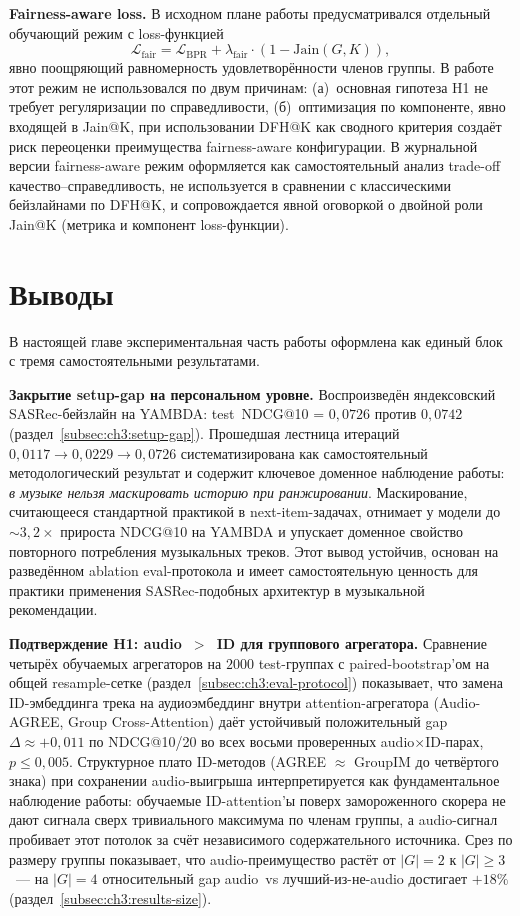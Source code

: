\textbf{Fairness-aware loss.} В исходном плане работы предусматривался отдельный обучающий режим с loss-функцией
\begin{equation*}
    \mathcal{L}_{\mathrm{fair}} = \mathcal{L}_{\mathrm{BPR}} + \lambda_{\mathrm{fair}} \cdot \left( 1 - \mathrm{Jain}(G, K) \right),
\end{equation*}
явно поощряющий равномерность удовлетворённости членов группы. В работе этот режим не использовался по двум причинам: (а)~основная гипотеза H1 не требует регуляризации по справедливости, (б)~оптимизация по компоненте, явно входящей в Jain@K, при использовании DFH@K как сводного критерия создаёт риск переоценки преимущества fairness-aware конфигурации. В журнальной версии fairness-aware режим оформляется как самостоятельный анализ trade-off качество--справедливость, не используется в сравнении с классическими бейзлайнами по DFH@K, и сопровождается явной оговоркой о двойной роли Jain@K (метрика и компонент loss-функции).

\section{Выводы}\label{sec:ch3:conclusion}

В настоящей главе экспериментальная часть работы оформлена как единый блок с тремя самостоятельными результатами.

\textbf{Закрытие setup-gap на персональном уровне.} Воспроизведён яндексовский SASRec-бейзлайн на YAMBDA: test~NDCG@10 = $0{,}0726$ против $0{,}0742$ (раздел~\ref{subsec:ch3:setup-gap}). Прошедшая лестница итераций $0{,}0117 \to 0{,}0229 \to 0{,}0726$ систематизирована как самостоятельный методологический результат и содержит ключевое доменное наблюдение работы: \emph{в музыке нельзя маскировать историю при ранжировании}. Маскирование, считающееся стандартной практикой в next-item-задачах, отнимает у модели до $\sim$$3{,}2\times$ прироста NDCG@10 на YAMBDA и упускает доменное свойство повторного потребления музыкальных треков. Этот вывод устойчив, основан на разведённом ablation eval-протокола и имеет самостоятельную ценность для практики применения SASRec-подобных архитектур в музыкальной рекомендации.

\textbf{Подтверждение H1: audio~$>$~ID для группового агрегатора.} Сравнение четырёх обучаемых агрегаторов на $2000$ test-группах с paired-bootstrap'ом на общей resample-сетке (раздел~\ref{subsec:ch3:eval-protocol}) показывает, что замена ID-эмбеддинга трека на аудиоэмбеддинг внутри attention-агрегатора (Audio-AGREE, Group Cross-Attention) даёт устойчивый положительный gap $\Delta \approx +0{,}011$ по NDCG@10/20 во всех восьми проверенных audio${\times}$ID-парах, $p \leq 0{,}005$. Структурное плато ID-методов (AGREE $\approx$ GroupIM до четвёртого знака) при сохранении audio-выигрыша интерпретируется как фундаментальное наблюдение работы: обучаемые ID-attention'ы поверх замороженного скорера не дают сигнала сверх тривиального максимума по членам группы, а audio-сигнал пробивает этот потолок за счёт независимого содержательного источника. Срез по размеру группы показывает, что audio-преимущество растёт от $|G| = 2$ к $|G| \geq 3$~--- на $|G| = 4$ относительный gap audio~vs лучший-из-не-audio достигает $+18\%$ (раздел~\ref{subsec:ch3:results-size}).

